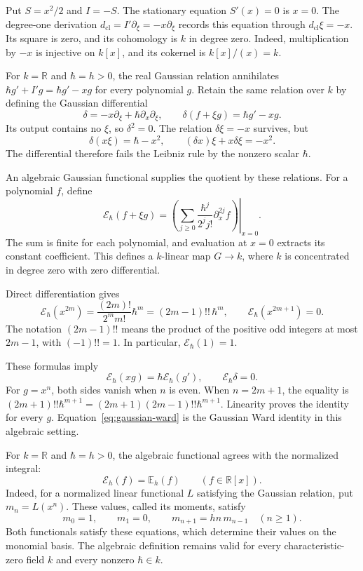 Put $S=x^2/2$ and $I=-S$.
The stationary equation $S'(x)=0$ is $x=0$.
The degree-one derivation
$d_{\mathrm{cl}}=I'\partial_\xi=-x\partial_\xi$ records this equation
through $d_{\mathrm{cl}}\xi=-x$.
Its square is zero, and its cohomology is $k$ in degree zero.
Indeed, multiplication by $-x$ is injective on $k[x]$, and its cokernel
is $k[x]/(x)=k$.

For $k=\mathbb R$ and $\hbar=h>0$, the real Gaussian relation
annihilates $\hbar g'+I'g=\hbar g'-xg$ for every polynomial $g$.
Retain the same relation over $k$ by defining the Gaussian differential
\begin{equation}\label{eq:gaussian-differential}
 \delta=-x\partial_\xi+\hbar\partial_x\partial_\xi,
 \qquad \delta(f+\xi g)=\hbar g'-xg.
\end{equation}
Its output contains no $\xi$, so $\delta^2=0$.
The relation $\delta\xi=-x$ survives, but
\[
 \delta(x\xi)=\hbar-x^2,
 \qquad
 (\delta x)\xi+x\delta\xi=-x^2.
\]
The differential therefore fails the Leibniz rule by the nonzero scalar
$\hbar$.

An algebraic Gaussian functional supplies the quotient by these relations.
For a polynomial $f$, define
\begin{equation}\label{eq:gaussian-functional}
 \mathcal E_\hbar(f+\xi g)
 =\left.\left(\sum_{j\geq0}
       \frac{\hbar^j}{2^j j!}\partial_x^{2j}f\right)\right|_{x=0}.
\end{equation}
The sum is finite for each polynomial, and evaluation at $x=0$ extracts
its constant coefficient. This defines a $k$-linear map $G\to k$, where
$k$ is concentrated in degree zero with zero differential.

Direct differentiation gives
\[
 \mathcal E_\hbar(x^{2m})
 =\frac{(2m)!}{2^m m!}\hbar^m
 =(2m-1)!!\,\hbar^m,
 \qquad \mathcal E_\hbar(x^{2m+1})=0.
\]
The notation $(2m-1)!!$ means the product of the positive odd integers
at most $2m-1$, with $(-1)!!=1$.
In particular, $\mathcal E_\hbar(1)=1$.

These formulas imply
\begin{equation}\label{eq:gaussian-ward}
 \mathcal E_\hbar(xg)=\hbar\mathcal E_\hbar(g'),
 \qquad \mathcal E_\hbar\delta=0.
\end{equation}
For $g=x^n$, both sides vanish when $n$ is even.
When $n=2m+1$, the equality is
$(2m+1)!!\hbar^{m+1}=(2m+1)(2m-1)!!\hbar^{m+1}$.
Linearity proves the identity for every $g$.
Equation~\eqref{eq:gaussian-ward} is the Gaussian Ward identity in this
algebraic setting.

For $k=\mathbb R$ and $\hbar=h>0$, the algebraic functional agrees with
the normalized integral:
\[
 \mathcal E_h(f)=\mathbb E_h(f)
 \qquad(f\in\mathbb R[x]).
\]
Indeed, for a normalized linear functional $L$ satisfying the Gaussian
relation, put $m_n=L(x^n)$.
These values, called its moments, satisfy
\[
 m_0=1,\qquad m_1=0,\qquad
 m_{n+1}=hn\,m_{n-1}\quad(n\geq1).
\]
Both functionals satisfy these equations, which determine their values
on the monomial basis.
The algebraic definition remains valid for every characteristic-zero
field $k$ and every nonzero $\hbar\in k$.

